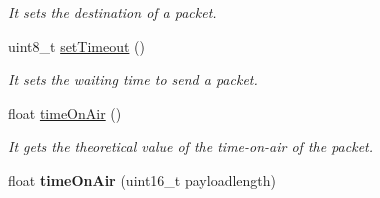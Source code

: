 \begin{DoxyCompactItemize}
\begin{DoxyCompactList}\small\item\em It sets the destination of a packet. \end{DoxyCompactList}\item 
uint8\+\_\+t \hyperlink{class_wasp_s_x1272_ab3d853aa4bf2aad5b4beb9b3f8fb881a}{set\+Timeout} ()
\begin{DoxyCompactList}\small\item\em It sets the waiting time to send a packet. \end{DoxyCompactList}\item 
float \hyperlink{class_wasp_s_x1272_af4d14db4017412597273b96f0961101e}{time\+On\+Air} ()
\begin{DoxyCompactList}\small\item\em It gets the theoretical value of the time-\/on-\/air of the packet. \end{DoxyCompactList}\item 
float {\bfseries time\+On\+Air} (uint16\+\_\+t payloadlength)\hypertarget{class_wasp_s_x1272_adf9f7c849e6f0ce66135143028ca9d77}{}\label{class_wasp_s_x1272_adf9f7c849e6f0ce66135143028ca9d77}


\end{DoxyCompactItemize}
